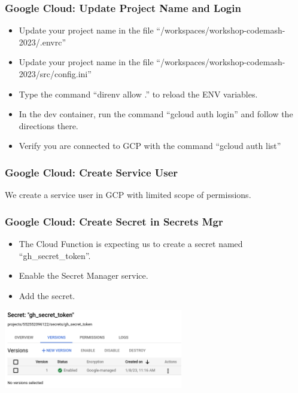 \documentclass[aspectratio=169]{beamer}
\begin{document}
\begin{frame}
	\frametitle{Google Cloud: Update Project Name and Login}
	\begin{itemize}
		\item Update your project name in the file ``/workspaces/workshop-codemash-2023/.envrc''
		\item Update your project name in the file ``/workspaces/workshop-codemash-2023/src/config.ini''
		\item Type the command ``direnv allow .'' to reload the ENV variables.
		\item In the dev container, run the command ``gcloud auth login'' and follow the directions there.
		\item Verify you are connected to GCP with the command ``gcloud auth list''
	\end{itemize}
\end{frame}

\begin{frame}
	\frametitle{Google Cloud: Create Service User}
	We create a service user in GCP with limited scope of permissions.
\end{frame}

\begin{frame}
	\frametitle{Google Cloud: Create Secret in Secrets Mgr}

	\begin{itemize}
		\item The Cloud Function is expecting us to create a secret named ``gh\_secret\_token''.
		\item Enable the Secret Manager service.
		\item Add the secret.
	\end{itemize}
	\begin{center}
		\includegraphics[width=0.585\textwidth]{../images/gcp-secret.png}
	\end{center}
\end{frame}

\end{document}
